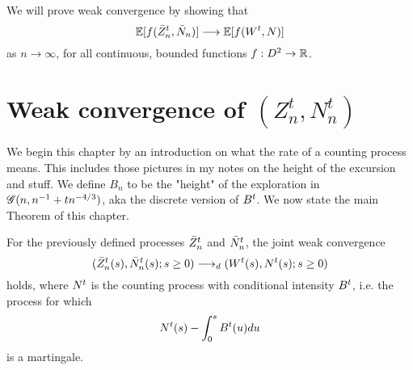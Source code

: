 We will prove weak convergence by showing that
\begin{equation}
\mathbb{E}[ f(\bar{Z}^t_n, \bar{N}_n) ] \longrightarrow \mathbb{E}[ f(W^t, N) ]
\end{equation}
as $n \rightarrow \infty$, 
for all continuous, bounded functions 
$f: D^2 \rightarrow \mathbb{R}$.


\section{Weak convergence of $(Z^t_n, N^t_n)$}

We begin this chapter by an introduction on what the rate of a counting process means.
This includes those pictures in my notes on the height of the excursion and stuff.
We define $B_n$ to be the "height" of the exploration in $\mathscr{G}(n, n^{-1} + tn^{-4/3})$, aka the discrete version of $B^t$.
We now state the main Theorem of this chapter.


\begin{theorem} \label{T: Joint Convergence}
	For the previously defined processes $\bar{Z}^t_n$ and $\bar{N}_n^t$,
	the joint weak convergence
	\begin{equation}
	( \bar{Z}^t_n(s), \bar{N}_n^t(s); s \geq 0 ) \longrightarrow_d (W^t(s), N^t(s); s \geq 0)
	\end{equation}
	holds, where $N^t$ is the counting process with conditional intensity $B^t$,
	i.e. the process for which
	\begin{equation*}
	N^t(s) - \int_{0}^s B^t(u)du
	\end{equation*}
	is a martingale.
\end{theorem}

